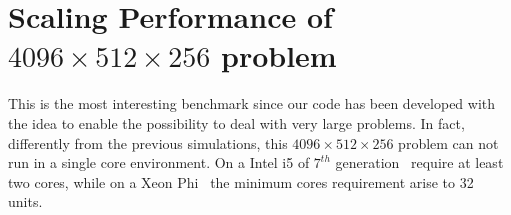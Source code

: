 \section{Scaling Performance of $4096\times512\times256$ problem}
This is the most interesting benchmark since our code has been developed with the idea to enable the possibility to deal with very large problems.
In fact, differently from the previous simulations, this $4096\times 512 \times 256$ problem can not run in a single core environment.
On a Intel i5 of $7^{th}$ generation~\cite{intel:i5} require at least two cores, while on a Xeon Phi~\cite{intel:xeonphi} the minimum cores requirement arise to 32 units.
